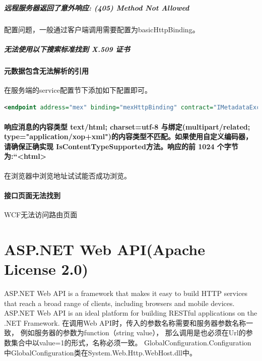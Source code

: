 \documentclass{book}
\begin{document}
\paragraph{远程服务器返回了意外响应: (405) Method Not Allowed}

配置问题，一般通过客户端调用需要配置为basicHttpBinding。

\paragraph{无法使用以下搜索标准找到 X.509 证书}

\subsubsection{元数据包含无法解析的引用}

在服务端的service配置节下添加如下配置即可。

\begin{lstlisting}[language=XML]
<endpoint address="mex" binding="mexHttpBinding" contract="IMetadataExchange" />
\end{lstlisting}

\subsubsection{响应消息的内容类型 text/html; charset=utf-8 与绑定(multipart/related; type="application/xop+xml")的内容类型不匹配。如果使用自定义编码器，请确保正确实现 IsContentTypeSupported方法。响应的前 1024 个字节为:“<html>}

在浏览器中浏览地址试试能否成功浏览。

\subsubsection{接口页面无法找到}

WCF无法访问路由页面

\chapter{ASP.NET Web API(Apache License 2.0)}

\clearpage
\mbox{}         
\clearpage

ASP.NET Web API is a framework that makes it easy to build 
HTTP services that reach a broad range of clients, 
including browsers and mobile devices. 
ASP.NET Web API is an ideal platform for building RESTful applications on the .NET Framework.
在调用Web API时，传入的参数名称需要和服务器参数名称一致，
例如服务器的参数为function（string value），
那么调用是也必须在Url的参数集合中以value=1的形式，名称必须一致。
GlobalConfiguration.Configuration中GlobalConfiguration类在System.Web.Http.WebHost.dll中。
\end{document}
